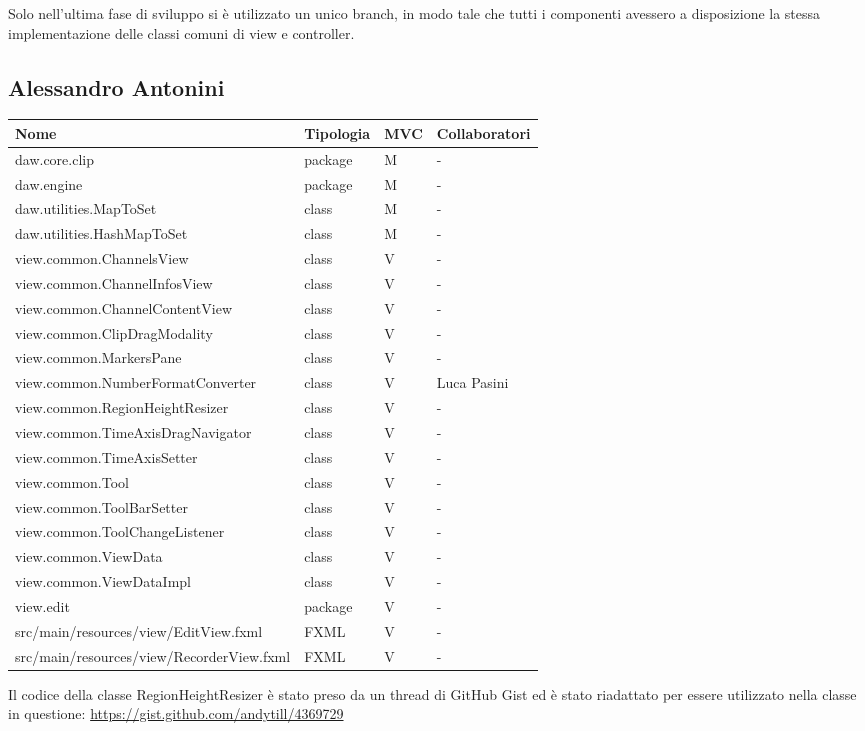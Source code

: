 \documentclass[a4paper,12pt]{report}
\begin{document}
Solo nell'ultima fase di sviluppo si è utilizzato un unico branch, in modo tale che tutti i componenti avessero a disposizione la stessa implementazione delle classi comuni di view e controller.

\subsection{Alessandro Antonini}

\begin{center}
\begin{longtable}{| m{22.5em} | m{2cm}| m{1cm} | m{2.7cm} |} 
 \hline
  \textbf{Nome} & \textbf{Tipologia} & \textbf{MVC} & \textbf{Collaboratori} \\ [0.5ex]
 \hline
 daw.core.clip & package & M & - \\ 
 \hline
 daw.engine & package & M & - \\
 \hline
 daw.utilities.MapToSet & class & M & - \\
 \hline
 daw.utilities.HashMapToSet & class & M & - \\
 \hline
 view.common.ChannelsView & class & V & - \\
\hline
 view.common.ChannelInfosView & class & V & - \\
\hline
view.common.ChannelContentView & class & V & - \\
\hline
view.common.ClipDragModality & class & V & - \\
\hline
view.common.MarkersPane & class & V & - \\
\hline
view.common.NumberFormatConverter & class & V & Luca Pasini \\
\hline
view.common.RegionHeightResizer & class & V & - \\
\hline
view.common.TimeAxisDragNavigator & class & V & - \\
\hline
view.common.TimeAxisSetter & class & V & - \\
\hline
view.common.Tool & class & V & - \\
\hline
view.common.ToolBarSetter & class & V & - \\
\hline
view.common.ToolChangeListener & class & V & - \\
\hline
view.common.ViewData & class & V & - \\
\hline
view.common.ViewDataImpl & class & V & - \\
\hline
view.edit & package & V & - \\
\hline
src/main/resources/view/EditView.fxml & FXML & V & - \\
\hline
src/main/resources/view/RecorderView.fxml & FXML & V & - \\
\hline
\end{longtable}
\end{center}
Il codice della classe RegionHeightResizer è stato preso da un thread di GitHub Gist ed è stato riadattato per essere utilizzato nella classe in questione:
\href{https://gist.github.com/andytill/4369729}{https://gist.github.com/andytill/4369729}
\end{document}
